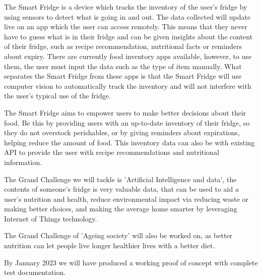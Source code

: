 The Smart Fridge is a device which tracks the inventory of the user's fridge by using sensors to detect what is going in and out.
The data collected will update live on an app which the user can access remotely.
This means that they never have to guess what is in their fridge and can be given insights about the content of their fridge,
such as recipe recommendation, nutritional facts or reminders about expiry.
There are currently food inventory apps available, however, to use them, 
the user must input the data such as the type of item manually.
What separates the Smart Fridge from these apps is that the Smart Fridge will use computer vision to automatically track the inventory 
and will not interfere with the user's typical use of the fridge. 

The Smart Fridge aims to empower users to make better decisions about their food. 
Be this by providing users with an up-to-date inventory of their fridge, so they do not overstock perishables, 
or by giving reminders about expirations, helping reduce the amount of food. 
This inventory data can also be with existing API to provide the user with recipe recommendations and nutritional information. 

The Grand Challenge we will tackle is 'Artificial Intelligence and data', the contents of someone's fridge is very valuable data, 
that can be used to aid a user's nutrition and health, reduce environmental impact via reducing waste or making better choices, 
and making the average home smarter by leveraging Internet of Things technology. 

The Grand Challenge of 'Ageing society' will also be worked on, as better nutrition
can let people live longer healthier lives with a better diet.

By January 2023 we will have produced a working proof of concept with complete test documentation.  

